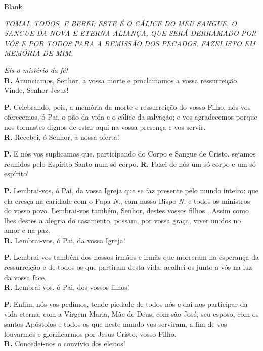\documentclass[a5paper,9pt]{memoir}
\begin{document}
{
\begin{paracol}{2}
{\color{white}Blank.}

\switchcolumn

\itshape
TOMAI, TODOS, E BEBEI: ESTE É O CÁLICE DO MEU SANGUE, O SANGUE DA NOVA E ETERNA ALIANÇA, QUE SERÁ DERRAMADO POR VÓS E POR TODOS PARA A REMISSÃO DOS PECADOS. FAZEI ISTO EM MEMÓRIA DE MIM.
\end{paracol}

\emph{Eis o mistério da fé!}\\
\textbf{R.} Anunciamos, Senhor, a vossa morte e proclamamos a vossa ressurreição. Vinde, Senhor Jesus!

\textbf{P.} Celebrando, pois, a mem\'oria da morte e ressurrei\c c\~ao do vosso Filho, n\'os vos oferecemos, \'o Pai, o p\~ao da vida e o c\'alice da salva\c c\~ao; e vos agradecemos porque nos tornastes dignos de estar aqui na vossa presen\c ca e vos servir.\\
\textbf{R.} Recebei, ó Senhor, a nossa oferta!

\textbf{P.} E n\'os vos suplicamos que, participando do Corpo e Sangue de Cristo, sejamos reunidos pelo Esp\'irito Santo num s\'o corpo.
\textbf{R.} Fazei de n\'os um s\'o corpo e um s\'o esp\'irito!

\textbf{P.} Lembrai-vos, \'o Pai, da vossa Igreja que se faz presente pelo mundo inteiro: que ela cres\c ca na caridade com o Papa \emph{N.}, com nosso Bispo \emph{N.} e todos os ministros do vosso povo. Lembrai-vos tamb\'em, Senhor, destes vossos filhos \BG. Assim como lhes destes a alegria do casamento, possam, por vossa gra\c ca, viver unidos no amor e na paz.\\
\textbf{R.} Lembrai-vos, \'o Pai, da vossa Igreja!

\textbf{P.} Lembrai-vos tamb\'em dos nossos irm\~aos e irm\~as que morreram na esperan\c ca da ressurrei\c c\~ao e de todos os que partiram desta vida: acolhei-os junto a v\'os na luz da vossa face.\\
\textbf{R.} Lembrai-vos, \'o Pai, dos vossos filhos!

\textbf{P.} Enfim, n\'os vos pedimos, tende piedade de todos n\'os e dai-nos participar da vida eterna, com a Virgem Maria, M\~ae de Deus, com s\~ao Jos\'e, seu esposo, com os santos Ap\'ostolos e todos os que neste mundo vos serviram, a fim de vos louvarmos e glorificarmos por Jesus Cristo, vosso Filho.\\
\textbf{R.} Concedei-nos o conv\'ivio dos eleitos!

}
\end{document}
